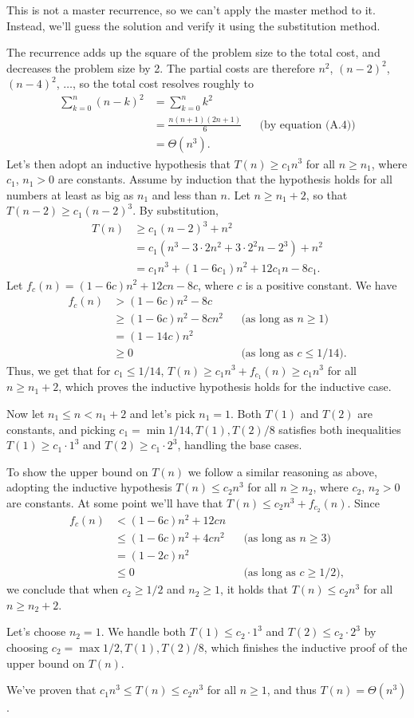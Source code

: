 This is not a master recurrence, so we can't apply the master method to it.
Instead, we'll guess the solution and verify it using the substitution method.

The recurrence adds up the square of the problem size to the total cost, and decreases the problem size by 2.
The partial costs are therefore $n^2$, $(n-2)^2$, $(n-4)^2$, $\dots$, so the total cost resolves roughly to
\begin{align*}
    \sum_{k=0}^n(n-k)^2 &= \sum_{k=0}^nk^2 \\[1mm]
    &= \frac{n(n+1)(2n+1)}{6} && \text{(by equation (A.4))} \\
    &= \Theta(n^3).
\end{align*}
Let's then adopt an inductive hypothesis that $T(n)\ge c_1n^3$ for all $n\ge n_1$, where $c_1$, $n_1>0$ are constants.
Assume by induction that the hypothesis holds for all numbers at least as big as $n_1$ and less than $n$.
Let $n\ge n_1+2$, so that $T(n-2)\ge c_1(n-2)^3$.
By substitution,
\begin{align*}
    T(n) &\ge c_1(n-2)^3+n^2 \\
    &= c_1(n^3-3\cdot2n^2+3\cdot2^2n-2^3)+n^2 \\
    &= c_1n^3+(1-6c_1)n^2+12c_1n-8c_1.
\end{align*}
Let $f_c(n)=(1-6c)n^2+12cn-8c$, where $c$ is a positive constant.
We have
\begin{align*}
    f_c(n) &> (1-6c)n^2-8c \\
    &\ge (1-6c)n^2-8cn^2 && \text{(as long as $n\ge1$)} \\
    &= (1-14c)n^2 \\
    &\ge 0 && \text{(as long as $c\le1/14$)}.
\end{align*}
Thus, we get that for $c_1\le1/14$, $T(n)\ge c_1n^3+f_{c_1}(n)\ge c_1n^3$ for all $n\ge n_1+2$, which proves the inductive hypothesis holds for the inductive case.

Now let $n_1\le n<n_1+2$ and let's pick $n_1=1$.
Both $T(1)$ and $T(2)$ are constants, and picking $c_1=\min{1/14,T(1),T(2)/8}$ satisfies both inequalities $T(1)\ge c_1\cdot1^3$ and $T(2)\ge c_1\cdot2^3$, handling the base cases.

To show the upper bound on $T(n)$ we follow a similar reasoning as above, adopting the inductive hypothesis $T(n)\le c_2n^3$ for all $n\ge n_2$, where $c_2$, $n_2>0$ are constants.
At some point we'll have that $T(n)\le c_2n^3+f_{c_2}(n)$.
Since
\begin{align*}
    f_c(n) &< (1-6c)n^2+12cn \\
    &\le (1-6c)n^2+4cn^2 && \text{(as long as $n\ge3$)} \\
    &= (1-2c)n^2 \\
    &\le 0 && \text{(as long as $c\ge1/2$)},
\end{align*}
we conclude that when $c_2\ge1/2$ and $n_2\ge1$, it holds that $T(n)\le c_2n^3$ for all $n\ge n_2+2$.

Let's choose $n_2=1$.
We handle both $T(1)\le c_2\cdot1^3$ and $T(2)\le c_2\cdot2^3$ by choosing $c_2=\max{1/2,T(1),T(2)/8}$, which finishes the inductive proof of the upper bound on $T(n)$.

We've proven that $c_1n^3\le T(n)\le c_2n^3$ for all $n\ge1$, and thus $T(n)=\Theta(n^3)$.
